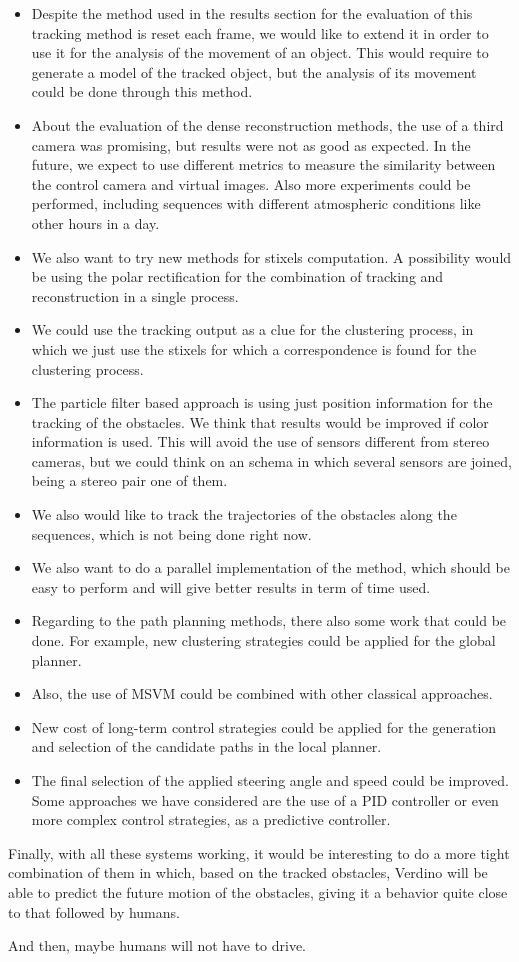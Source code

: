 \begin{itemize}
 \item Despite the method used in the results section for the evaluation of this tracking method is reset each frame, we would like to extend it in order to use it for the analysis of the movement of an object. This would require to generate a model of the tracked object, but the analysis of its movement could be done through this method.
 \item About the evaluation of the dense reconstruction methods, the use of a third camera was promising, but results were not as good as expected. In the future, we expect to use different metrics to measure the similarity between the control camera and virtual images. Also more experiments could be performed, including sequences with different atmospheric conditions like other hours in a day.
 \item We also want to try new methods for stixels computation. A possibility would be using the polar rectification for the combination of tracking and reconstruction in a single process. 
 \item We could use the tracking output as a clue for the clustering process, in which we just use the stixels for which a correspondence is found for the clustering process.
 \item The particle filter based approach is using just position information for the tracking of the obstacles. We think that results would be improved if color information is used. This will avoid the use of sensors different from stereo cameras, but we could think on an schema in which several sensors are joined, being a stereo pair one of them.
 \item We also would like to track the trajectories of the obstacles along the sequences, which is not being done right now.
 \item We also want to do a parallel implementation of the method, which should be easy to perform and will give better results in term of time used.
 \item Regarding to the path planning methods, there also some work that could be done. For example, new clustering strategies could be applied for the global planner.
 \item Also, the use of \ac{MSVM} could be combined with other classical approaches.
 \item New cost of long-term control strategies could be applied for the generation and selection of the candidate paths in the local planner.
 \item The final selection of the applied steering angle and speed could be improved. Some approaches we have considered are the use of a \ac{PID} controller or even more complex control strategies, as a predictive controller.
\end{itemize}

Finally, with all these systems working, it would be interesting to do a more tight combination of them in which, based on the tracked obstacles, Verdino will be able to predict the future motion of the obstacles, giving it a behavior quite close to that followed by humans.

And then, maybe humans will not have to drive.